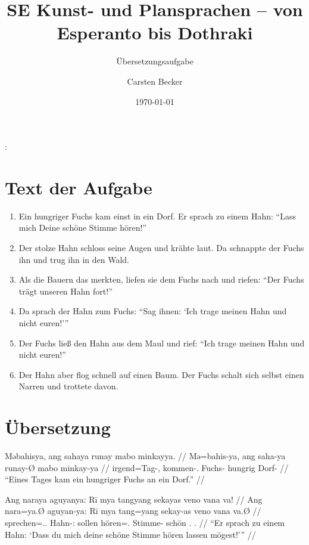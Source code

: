 \documentclass[12pt,paper=a4]{scrartcl}
\author{Carsten Becker}
\title{SE Kunst- und Plansprachen -- von Esperanto bis Dothraki}
\subtitle{Übersetzungsaufgabe}
\date{\today} %
\newcommand{\TsgM}{{\Tsg}.{\M}}
\newenvironment{mytitle}{
    \hfill
    \begin{minipage}{0.667\textwidth}
	\vspace{\baselineskip}
	\begin{center}
	    \Large
	    \sffamily\bfseries
	    \makeatletter
}{
	    \makeatother
	\end{center}
	\vspace{1em}
    \end{minipage}
    \hfill
}
\begin{document}

\begin{mytitle}
    \@title: \@subtitle\footnotemark
\end{mytitle}

\section{Text der Aufgabe}
\begin{enumerate}[noitemsep]
\item Ein hungriger Fuchs kam einst in ein Dorf. Er sprach zu einem Hahn: \enquote{Lass mich Deine schöne Stimme hören!}
\item Der stolze Hahn schloss seine Augen und krähte laut. Da schnappte der Fuchs ihn und trug ihn in den Wald.
\item Als die Bauern das merkten, liefen sie dem Fuchs nach und riefen: \enquote{Der Fuchs trägt unseren Hahn fort!}
\item Da sprach der Hahn zum Fuchs: \enquote{Sag ihnen: \enquote{Ich trage meinen Hahn und nicht euren!}}
\item Der Fuchs ließ den Hahn aus dem Maul und rief: \enquote{Ich trage meinen Hahn und nicht euren!}
\item Der Hahn aber flog schnell auf einen Baum. Der Fuchs schalt sich selbst einen Narren und trottete davon.
\end{enumerate}

\section{Übersetzung}

\pex %
\a\begingl
	\gla Məbahisya, ang sahaya runay mabo minkayya. //
	\glb Mə=bahis-ya, ang saha-ya runay-Ø mabo minkay-ya //
	\glc irgend=Tag-\Loc{}, \AgtT{} kommen-\TsgM{} Fuchs-\Top{} hungrig Dorf-\Loc{} //
	\glft \enquote{Eines Tages kam ein hungriger Fuchs an ein Dorf.} //
\endgl

\a\begingl
	\gla Ang naraya aguyanya: Rī mya tangyang sekayas veno vana va! //
	\glb Ang nara=ya.Ø aguyan-ya: Rī mya tang=yang sekay-as veno vana va.Ø //
	\glc \AgtT{} sprechen=\TsgM{}.\Top{} Hahn-\Loc{}: \CauT{} sollen hören=\Fsg{}.\Aarg{} Stimme-\Parg{} schön \Ssg{}.\Gen{} \Ssg{}.\Top{} //
	\glft \enquote{Er sprach zu einem Hahn: \enquote{Dass du mich deine schöne Stimme hören lassen mögest!}} //
\endgl
\end{document}
